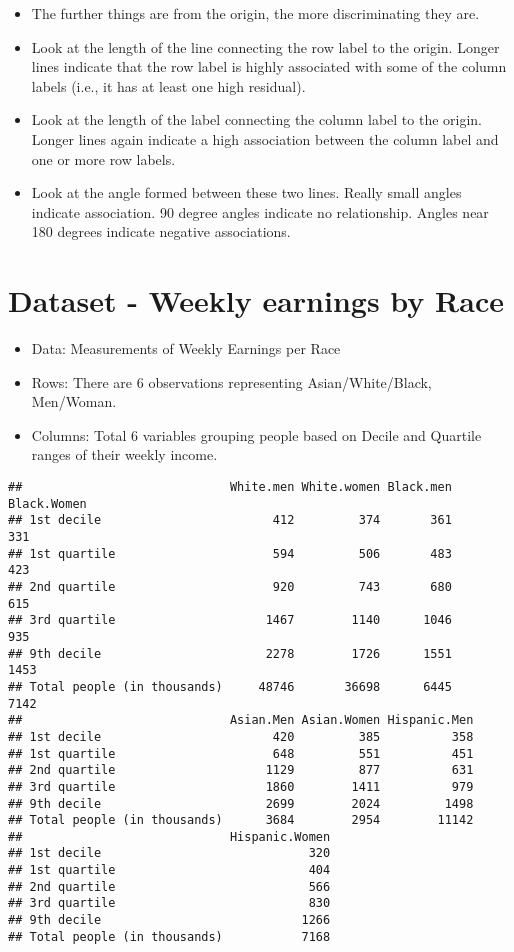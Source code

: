 \documentclass[]{book}
\providecommand{\tightlist}{%
  \setlength{\itemsep}{0pt}\setlength{\parskip}{0pt}}
\begin{document}
\begin{itemize}
\tightlist
\item
  The further things are from the origin, the more discriminating they
  are.
\item
  Look at the length of the line connecting the row label to the origin.
  Longer lines indicate that the row label is highly associated with
  some of the column labels (i.e., it has at least one high residual).
\item
  Look at the length of the label connecting the column label to the
  origin. Longer lines again indicate a high association between the
  column label and one or more row labels.
\item
  Look at the angle formed between these two lines. Really small angles
  indicate association. 90 degree angles indicate no relationship.
  Angles near 180 degrees indicate negative associations.
\end{itemize}

\hypertarget{dataset---weekly-earnings-by-race}{%
\section{Dataset - Weekly earnings by
Race}\label{dataset---weekly-earnings-by-race}}

\begin{itemize}
\tightlist
\item
  Data: Measurements of Weekly Earnings per Race
\item
  Rows: There are 6 observations representing Asian/White/Black,
  Men/Woman.
\item
  Columns: Total 6 variables grouping people based on Decile and
  Quartile ranges of their weekly income.
\end{itemize}

\begin{verbatim}
##                             White.men White.women Black.men Black.Women
## 1st decile                        412         374       361         331
## 1st quartile                      594         506       483         423
## 2nd quartile                      920         743       680         615
## 3rd quartile                     1467        1140      1046         935
## 9th decile                       2278        1726      1551        1453
## Total people (in thousands)     48746       36698      6445        7142
##                             Asian.Men Asian.Women Hispanic.Men
## 1st decile                        420         385          358
## 1st quartile                      648         551          451
## 2nd quartile                     1129         877          631
## 3rd quartile                     1860        1411          979
## 9th decile                       2699        2024         1498
## Total people (in thousands)      3684        2954        11142
##                             Hispanic.Women
## 1st decile                             320
## 1st quartile                           404
## 2nd quartile                           566
## 3rd quartile                           830
## 9th decile                            1266
## Total people (in thousands)           7168
\end{verbatim}
\end{document}
